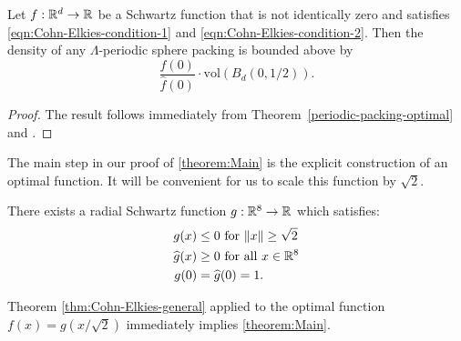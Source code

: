 \begin{theorem}\label{thm:Cohn-Elkies-general}\leanok
  Let $f:\mathbb{R}^d\to\mathbb{R}$ be a Schwartz function that is not identically zero and satisfies \eqref{eqn:Cohn-Elkies-condition-1} and \eqref{eqn:Cohn-Elkies-condition-2}. Then the density of any $\Lambda$-periodic sphere packing is bounded above by $$\frac{f(0)}{\widehat{f}(0)}\cdot \mathrm{vol}(B_d(0,1/2)).$$
\end{theorem}
\begin{proof}\leanok
  The result follows immediately from Theorem~\ref{periodic-packing-optimal} and .
\end{proof}

The main step in our proof of \cref{theorem:Main} is the explicit construction of an optimal function. It will be convenient for us to scale this function by $\sqrt{2}$.
\begin{theorem}\label{thm:g}
There exists a radial Schwartz function $g:\mathbb{R}^8\to\mathbb{R}$ which satisfies:
\begin{align}
g(x)&\leq 0\mbox{ for } \|x\|\geq \sqrt{2} \label{eqn:g1}\\
\widehat{g}(x)&\geq0\mbox{ for all } x\in\mathbb{R}^8\label{eqn:g2}\\
g(0)&=\widehat{g}(0)=1.\label{eqn:g3}
\end{align}
\end{theorem}
Theorem \ref{thm:Cohn-Elkies-general} applied to the optimal function $f(x)=g(x/\sqrt{2})$ immediately implies \cref{theorem:Main}.
